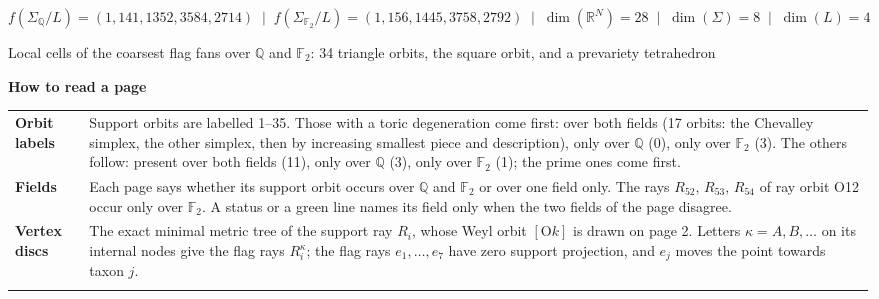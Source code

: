 \documentclass[14pt]{extarticle}
\begin{document}
\thispagestyle{empty}
\begin{center}\vspace*{4mm}
\par\vspace{1mm}
{\small\color{muted}\(f(\Sigma_{\mathbb{Q}}/L)=(1,141,1352,3584,2714)\;\mid\;
f(\Sigma_{\mathbb{F}_2}/L)=(1,156,1445,3758,2792)\;\mid\;
\dim(\mathbb R^N)=28\;\mid\;\dim(\Sigma)=8\;\mid\;\dim(L)=4\)}\par\vspace{3mm}
{\Large Local cells of the coarsest flag fans over \(\mathbb{Q}\) and \(\mathbb{F}_2\): 34 triangle orbits, the square orbit, and a prevariety tetrahedron}\par
\end{center}\vspace{10mm}
\begin{atlasbox}
\begin{atlaspanel}
{\Large\bfseries How to read a page}\par\vspace{3mm}
\begin{tabularx}{\linewidth}{@{}>{\bfseries}l@{\hspace{5mm}}X@{}}
Orbit labels & Support orbits are labelled 1--35.  Those with a
toric degeneration come first: over both fields (17 orbits: the Chevalley
simplex, the other simplex, then by increasing smallest piece and description),
only over \(\mathbb{Q}\) (0), only over \(\mathbb{F}_2\) (3).  The others
follow: present over both fields (11), only over \(\mathbb{Q}\) (3), only
over \(\mathbb{F}_2\) (1); the prime ones come first.\\\noalign{\vspace{2mm}}
Fields & Each page says whether its support orbit occurs over \(\mathbb{Q}\) and
\(\mathbb{F}_2\) or over one field only.  The rays \(R_{52},\,R_{53},\,R_{54}\) of ray orbit
O12 occur only over \(\mathbb{F}_2\).  A status or
a green line names its field only when the two fields of the page
disagree.\\\noalign{\vspace{2mm}}
Vertex discs & The exact minimal metric tree of the support ray \(R_i\), whose
Weyl orbit \([\mathrm O k]\) is drawn on page 2.  Letters
\(\kappa=A,B,\ldots\) on its internal nodes give the flag rays
\(R_i^\kappa\); the flag rays \(e_1,\ldots,e_7\) have zero support
projection, and \(e_j\) moves the point towards taxon \(j\).\\\noalign{\vspace{2mm}}

\end{tabularx}
\end{atlaspanel}
\end{atlasbox}
\end{document}
